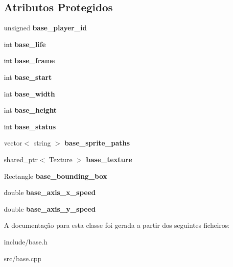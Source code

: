 \subsection*{Atributos Protegidos}
\begin{DoxyCompactItemize}
\item 
\mbox{\label{classBase_abfe4b56e9035242ac9a5ceb774ead189}} 
unsigned {\bfseries base\+\_\+player\+\_\+id}
\item 
\mbox{\label{classBase_a3a5ef7ba44286d75ac91b314e8f9bba5}} 
int {\bfseries base\+\_\+life}
\item 
\mbox{\label{classBase_a25115b97013a8f9c19485992943b7bee}} 
int {\bfseries base\+\_\+frame}
\item 
\mbox{\label{classBase_ae6825b079b31eb5e2295fe74000331b6}} 
int {\bfseries base\+\_\+start}
\item 
\mbox{\label{classBase_af14e8b3b3f8e64b94a4a3a5053ffc100}} 
int {\bfseries base\+\_\+width}
\item 
\mbox{\label{classBase_a8af1088a92883b0fec24293143071aab}} 
int {\bfseries base\+\_\+height}
\item 
\mbox{\label{classBase_a0db4876e47d72f19c0959b12c7b8128f}} 
int {\bfseries base\+\_\+status}
\item 
\mbox{\label{classBase_a8010ab166f9a8468d6b1006a6f8efa83}} 
vector$<$ string $>$ {\bfseries base\+\_\+sprite\+\_\+paths}
\item 
\mbox{\label{classBase_a1b641692d4aa3de6b0eb3c9f9ca5d164}} 
shared\+\_\+ptr$<$ Texture $>$ {\bfseries base\+\_\+texture}
\item 
\mbox{\label{classBase_a6a62f99edec994a277fbb2d2b2221966}} 
Rectangle {\bfseries base\+\_\+bounding\+\_\+box}
\item 
\mbox{\label{classBase_af8b1625c4851d929cdd3a10650c6d0f5}} 
double {\bfseries base\+\_\+axis\+\_\+x\+\_\+speed}
\item 
\mbox{\label{classBase_ac472e9bbf37bf28ab3794d51ffb32db3}} 
double {\bfseries base\+\_\+axis\+\_\+y\+\_\+speed}
\end{DoxyCompactItemize}


A documentação para esta classe foi gerada a partir dos seguintes ficheiros\+:\begin{DoxyCompactItemize}
\item 
include/base.\+h\item 
src/base.\+cpp\end{DoxyCompactItemize}
